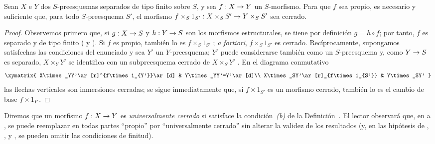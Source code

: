 \documentclass[oneside,10pt]{amsart}
\makeatletter
\newcommand{\ega@arrow}[2]{\mathchoice{#1}{#2}{#2}{#2}}
\renewcommand{\to}{\ega@arrow{\longrightarrow}{\rightarrow}}
\newcommand{\oldpage}[2][]{\marginnote{\normalfont\footnotesize\textbf{#1}~|~#2}\ignorespaces}
\let\EGAOriginalLabel\label
\renewcommand{\label}[1]{\phantomsection\EGAOriginalLabel{#1}}
\makeatother
\begin{document}
\begin{corollary}[5.4.8]
\label{II.5.4.8-fr}
Sean $X$ e $Y$ dos $S$-preesquemas separados de tipo finito sobre $S$, y sea $f:X\to Y$ un $S$-morfismo.
Para que $f$ sea propio, es necesario y suficiente que, para todo $S$-preesquema $S'$, el morfismo $f\times_S1_{S'}:X\times_SS'\to Y\times_SS'$ sea cerrado.
\end{corollary}

\begin{proof}
Observemos primero que, si $g:X\to S$ y $h:Y\to S$ son los morfismos estructurales, se tiene por definición $g=h\circ f$; por tanto, $f$ es separado y de tipo finito ( y ).
Si $f$ es propio, también lo es $f\times_S1_{S'}$ ; \emph{a fortiori}, $f\times_S1_{S'}$ es cerrado.
Recíprocamente, supongamos satisfechas las condiciones del enunciado y sea $Y'$ un $Y$-preesquema;
$Y'$ puede considerarse también como un $S$-preesquema y, como $Y\to S$ es separado, $X\times_YY'$ se identifica con un subpreesquema cerrado de $X\times_SY'$ .
En el diagrama conmutativo
\[
  \xymatrix{
    X\times_YY'\ar[r]^{f\times1_{Y'}}\ar[d] &
    Y\times_YY'=Y'\ar[d]\\
    X\times_SY'\ar[r]_{f\times1_{S'}} & Y\times_SY'
  }
\]
las flechas verticales son inmersiones cerradas; se sigue inmediatamente que, si $f\times1_{S'}$ es un morfismo cerrado, también lo es el cambio de base $f\times1_{Y'}$.
\end{proof}

\begin{remark}[5.4.9]
\label{II.5.4.9-fr}
Diremos que un morfismo $f:X\to Y$ es \emph{universalmente cerrado} si satisface la condición~\emph{(b)} de la Definición~.
El lector observará que,
\oldpage[II]{103}
en  a , se puede reemplazar en todas partes ``propio'' por ``universalmente cerrado'' sin alterar la validez de los resultados (y, en las hipótesis de , ,  y , se pueden omitir las condiciones de finitud).
\end{remark}
\end{document}

